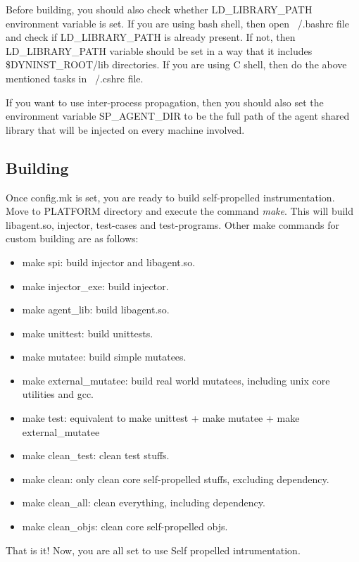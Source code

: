 Before building, you should also check whether LD\_LIBRARY\_PATH environment
variable is set. If you are using bash shell, then open ~/.bashrc file and check
if LD\_LIBRARY\_PATH is already present. If not, then LD\_LIBRARY\_PATH variable
should be set in a way that it includes {\$DYNINST\_ROOT}/lib directories.  If
you are using C shell, then do the above mentioned tasks in ~/.cshrc file.

If you want to use inter-process propagation, then you should also set the
environment variable SP\_AGENT\_DIR to be the full path of the agent shared
library that will be injected on every machine involved.
 
\subsection{Building}
Once config.mk is set, you are ready to build self-propelled
instrumentation. Move to PLATFORM directory and execute the command
\textit{make}. This will build libagent.so, injector, test-cases and
test-programs. Other make commands for custom building are as follows:

\begin{itemize}
\item make spi: build injector and libagent.so.
\item make injector\_exe: build injector.
\item make agent\_lib: build libagent.so.
\item make unittest: build unittests.
\item make mutatee: build simple mutatees.
\item make external_mutatee: build real world mutatees, including unix core
  utilities and gcc.
\item make test: equivalent to make unittest + make mutatee + make
  external_mutatee
\item make clean_test: clean test stuffs.
\item make clean: only clean core self-propelled stuffs, excluding dependency.
\item make clean_all: clean everything, including dependency.
\item make clean_objs: clean core self-propelled objs.
\end{itemize}

That is it! Now, you are all set to use Self propelled intrumentation.
